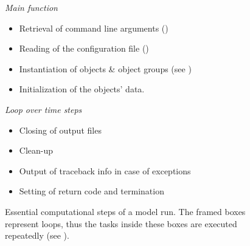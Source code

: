 \begin{figure}[h]
\smallskip
\textit{Main function} \\
\colorbox{shadecolor}{
\begin{minipage}{0.95\columnwidth}
  \smallskip
  \begin{itemize}
    \item Retrieval of command line arguments ()
    \item Reading of the configuration file ()
    \item Instantiation of objects \& object groups (see )
    \item Initialization of the objects' data.
  \end{itemize}
  \smallskip
    \textit{Loop over time steps} \\
    \begin{itemize}
      \item Closing of output files
    \end{itemize}
  \begin{itemize}
    \item Clean-up
    \item Output of traceback info in case of exceptions
    \item Setting of return code and termination
  \end{itemize}
\end{minipage}
}
  \caption[Essential computational steps of a model run.]{Essential computational steps of a model run. The framed boxes represent loops, thus the tasks inside these boxes are executed repeatedly (see ). \label{fig:concept-compSteps}}
\end{figure}

